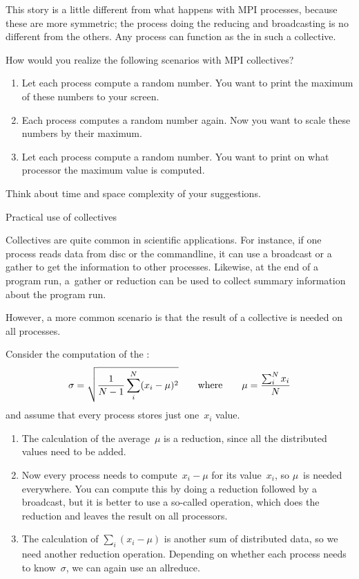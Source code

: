 This story is a little different from what happens with MPI
processes, because these are more symmetric; the process doing the
reducing and broadcasting is no different from the others.
Any process can function as the  in such a
collective.

\begin{exercise}
  \label{ex:collective-cases}
  How would you realize the following scenarios with MPI collectives?
  \begin{enumerate}
  \item Let each process compute a random number. You want to print the
    maximum of these numbers to your screen.
  \item Each process computes a random number again. Now you want to
    scale these numbers by their maximum. 
  \item Let each process compute a random number. You want to print on what processor the
    maximum value is computed. 
  \end{enumerate}
  Think about time and space complexity of your suggestions.
\end{exercise}

 {Practical use of collectives}

Collectives are quite common in scientific applications. For instance,
if one process reads data from disc or the commandline, it can use a
broadcast or a gather to get the information to other
processes. Likewise, at the end of a program run, a~gather or
reduction can be used to collect summary information about the program
run.

However, a more common scenario is 
that the result of a collective is needed on all processes.

Consider the computation of the :
\[ \sigma = \sqrt{\frac1{N-1} \sum_i^N (x_i-\mu)^2 }
\qquad\hbox{where}\qquad \mu = \frac{\sum_i^Nx_i}N
\]
and assume that every process stores just one~$x_i$ value.
\begin{enumerate}
\item The calculation of the average~$\mu$ is a reduction, since all
  the distributed values need to be added.
\item Now every
  process needs to compute~$x_i-\mu$ for its value~$x_i$, so $\mu$~is
  needed everywhere. You can compute this by doing a reduction followed
  by a broadcast, but it is better to use a so-called
   operation, which does the reduction and leaves
  the result on all processors.
\item The calculation of $\sum_i(x_i-\mu)$ is another sum of
  distributed data, so we need another reduction operation. Depending
  on whether each process needs to know~$\sigma$, we can again use an
  allreduce.
\end{enumerate}

